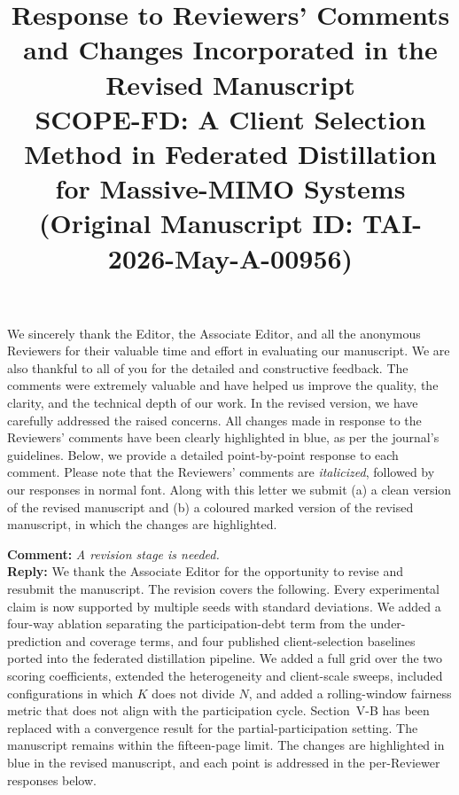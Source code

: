 \documentclass[10pt]{article}
\newcommand{\paperTitle}{SCOPE-FD: A Client Selection Method in Federated Distillation for Massive-MIMO Systems}
\begin{document}
\title{
\small Response to Reviewers' Comments and Changes Incorporated in the Revised Manuscript \\
\vspace{1em}
{\Large \bf \paperTitle} \\
(\textbf{Original Manuscript ID: TAI-2026-May-A-00956})
}
\date{}
\maketitle

\vspace{-3em}

We sincerely thank the Editor, the Associate Editor, and all the anonymous Reviewers for their valuable time and effort in evaluating our manuscript. We are also thankful to all of you for the detailed and constructive feedback. The comments were extremely valuable and have helped us improve the quality, the clarity, and the technical depth of our work. In the revised version, we have carefully addressed the raised concerns. {\color{blue}All changes made in response to the Reviewers' comments have been clearly highlighted in blue, as per the journal's guidelines}. Below, we provide a detailed point-by-point response to each comment. Please note that the Reviewers' comments are \textit{italicized}, followed by our responses in normal font. Along with this letter we submit (a) a clean version of the revised manuscript and (b) a coloured marked version of the revised manuscript, in which the changes are highlighted.\\


\noindent
\textbf{Comment:} \textit{A revision stage is needed.}\\
\noindent
\textbf{Reply:} {We thank the Associate Editor for the opportunity to revise and resubmit the manuscript. The revision covers the following. Every experimental claim is now supported by multiple seeds with standard deviations. We added a four-way ablation separating the participation-debt term from the under-prediction and coverage terms, and four published client-selection baselines ported into the federated distillation pipeline. We added a full grid over the two scoring coefficients, extended the heterogeneity and client-scale sweeps, included configurations in which $K$ does not divide $N$, and added a rolling-window fairness metric that does not align with the participation cycle. Section~V-B has been replaced with a convergence result for the partial-participation setting. The manuscript remains within the fifteen-page limit. The changes are highlighted in blue in the revised manuscript, and each point is addressed in the per-Reviewer responses below.}\\
\end{document}
